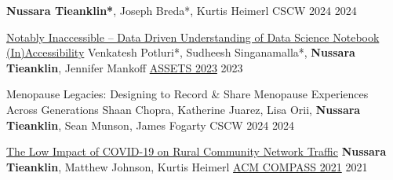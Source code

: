 

\begin{cventries}

\cvpub
    {} %
    {\textbf{Nussara Tieanklin*}, Joseph Breda*, Kurtis Heimerl} %
    {CSCW 2024} %
    {2024} %

\cvpub
    {\href{https://doi.org/10.1145/3597638.3608417}{Notably Inaccessible – Data Driven Understanding of Data Science Notebook (In)Accessibility}} %
    {Venkatesh Potluri*, Sudheesh Singanamalla*, \textbf{Nussara Tieanklin}, Jennifer Mankoff} %
    {\href{https://dl.acm.org/doi/10.1145/3597638.3608417}{ASSETS 2023}} %
    {2023} %

\cvpub
    {Menopause Legacies: Designing to Record \& Share Menopause Experiences Across Generations} %
    {Shaan Chopra, Katherine Juarez, Lisa Orii, \textbf{Nussara Tieanklin}, Sean Munson, James Fogarty} %
    {CSCW 2024} %
    {2024} %
  
  \cvpub
    {\href{https://dl.acm.org/doi/10.1145/3460112.3472311}{The Low Impact of COVID-19 on Rural Community Network Traffic}} %
    {\textbf{Nussara Tieanklin}, Matthew Johnson, Kurtis Heimerl}
    {\href{https://dl.acm.org/doi/10.1145/3460112.3472311}{ACM COMPASS 2021}}
    {2021}


\end{cventries}
